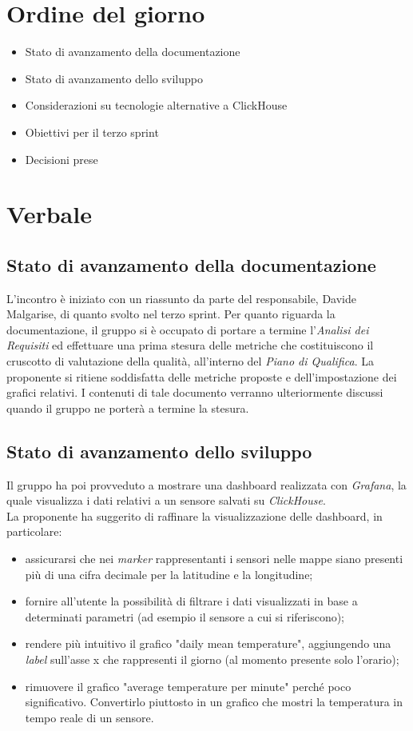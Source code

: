 \documentclass[italian,12pt]{article}
\begin{document}
\section{Ordine del giorno}
\begin{itemize}
	\item Stato di avanzamento della documentazione
	\item Stato di avanzamento dello sviluppo
	\item Considerazioni su tecnologie alternative a ClickHouse
	\item Obiettivi per il terzo sprint
	\item Decisioni prese
\end{itemize}

\newpage

\section{Verbale}

\subsection{Stato di avanzamento della documentazione}
L'incontro è iniziato con un riassunto da parte del responsabile, Davide Malgarise, di quanto svolto nel terzo sprint.
Per quanto riguarda la documentazione, il gruppo si è occupato di portare a termine l'\textit{Analisi dei Requisiti}
ed effettuare una prima stesura delle metriche che costituiscono il cruscotto di valutazione della qualità, all'interno del \textit{Piano di Qualifica}.
La proponente si ritiene soddisfatta delle metriche proposte e dell'impostazione dei grafici relativi.
I contenuti di tale documento verranno ulteriormente discussi quando il gruppo ne porterà a termine la stesura.

\subsection{Stato di avanzamento dello sviluppo}
Il gruppo ha poi provveduto a mostrare una dashboard realizzata con \textit{Grafana},
la quale visualizza i dati relativi a un sensore salvati su \textit{ClickHouse}.\\
La proponente ha suggerito di raffinare la visualizzazione delle dashboard, in particolare:
\begin{itemize}
	\label{item:consigli}
	\item assicurarsi che nei \textit{marker} rappresentanti i sensori nelle mappe siano presenti più di una cifra decimale per la latitudine e la longitudine;
	\item fornire all'utente la possibilità di filtrare i dati visualizzati in base a determinati parametri (ad esempio il sensore a cui si riferiscono);
	\item rendere più intuitivo il grafico "daily mean temperature", aggiungendo una \textit{label} sull'asse x che rappresenti il giorno (al momento presente solo l'orario);
	\item rimuovere il grafico "average temperature per minute" perché poco significativo. Convertirlo piuttosto in un grafico che mostri la temperatura in tempo reale di un sensore.
\end{itemize}
\end{document}
